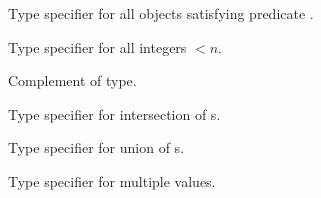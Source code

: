 \begin{LIST}{1cm}
  {
  Type specifier for all objects satisfying predicate . 
  }

  {
  Type specifier for all integers $<n$.
  }

  {
  Complement of type.
  }

  {
  Type specifier for intersection of s.
  }

  {
  Type specifier for union of s.
  }

  {
  Type specifier for multiple values.
  }

  \end{LIST}


